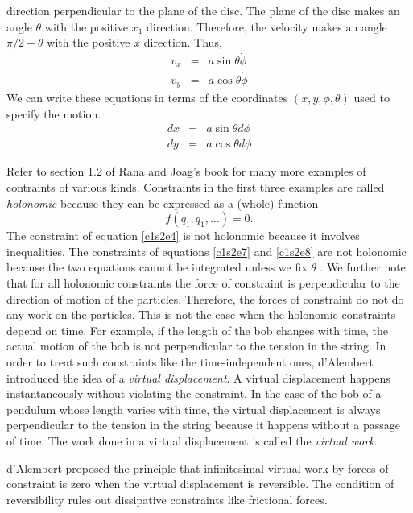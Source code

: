 \begin{enumerate}
direction perpendicular to the plane of the disc. The plane of the disc makes 
an angle $\theta$ with the positive $x_1$ direction. Therefore, the velocity 
makes an angle $\pi/2 - \theta$ with the positive $x$ direction. Thus,
\begin{eqnarray}
v_x &=& a\sin\theta\dot{\phi} \label{c1s2e5} \\
v_y &=& a\cos\theta\dot{\phi} \label{c1s2e6} 
\end{eqnarray}
We can write these equations in terms of the coordinates $(x, y, \phi, 
\theta)$ used to specify the motion.
\begin{eqnarray}
dx &=& a\sin\theta d\phi \label{c1s2e7} \\
dy &=& a\cos\theta d\phi \label{c1s2e8} 
\end{eqnarray}
\end{enumerate}
Refer to section 1.2 of Rana and Joag's book \cite{rc} for many more examples
of contraints of various kinds. Constraints in the first three examples are
called \emph{holonomic} because they can be expressed as a (whole) function
\begin{equation}\label{c1s2e9}
f(q_1, q_1, \ldots) = 0.
\end{equation}
The constraint of equation \eqref{c1s2e4} is not holonomic because it involves
inequalities. The constraints of equations \eqref{c1s2e7} and \eqref{c1s2e8}
are not holonomic because the two equations cannot be integrated unless we
fix $\theta$ \cite{goldstein2002classical}. We further note that for all
holonomic constraints the force of constraint is perpendicular to the direction
of motion of the particles. Therefore, the forces of constraint do not do any
work on the particles. This is not the case when the holonomic constraints 
depend on time. For example, if the length of the bob changes with time, the
actual motion of the bob is not perpendicular to the tension in the string.
In order to treat such constraints like the time-independent ones, d'Alembert
introduced the idea of a \emph{virtual displacement}. A virtual displacement
happens instantaneously without violating the constraint. In the case of the
bob of a pendulum whose length varies with time, the virtual displacement is
always perpendicular to the tension in the string because it happens without
a passage of time. The work done in a virtual displacement is called the 
\emph{virtual work}. 

d'Alembert proposed the principle that infinitesimal virtual work by forces of
constraint is zero when the virtual displacement is reversible. The condition
of reversibility rules out dissipative constraints like frictional forces.

